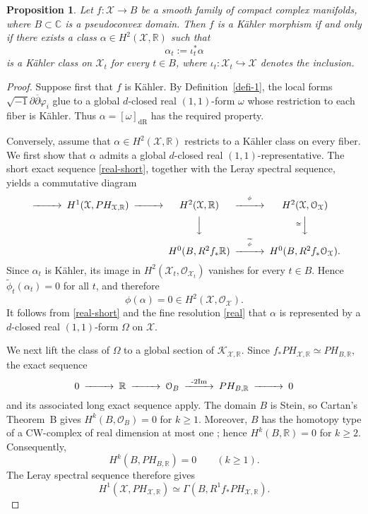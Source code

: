 \documentclass[11pt,letterpaper]{amsart}
\numberwithin{equation}{section}
\newcommand{\CC}{\mathbb{C}}
\newcommand{\RR}{\mathbb{R}}
\newcommand{\cal}{\mathcal}
\def\cO{{\cal O}}
\def\cX{{\cal X}}
\newtheorem{prop}{Proposition}[section]
\def\dbar{\overline{\partial}}
\def\beq{\begin{equation}}
\def\eeq{\end{equation}}
\begin{document}
\begin{prop}\label{global}
Let $f:\cX\to B$ be a smooth family of compact complex manifolds, where $B\subset\CC$ is a pseudoconvex domain. Then $f$ is a K\"ahler morphism if and only if there exists a class $\alpha\in H^2(\cX,\RR)$ such that
\[
 \alpha_t:=\iota_t^*\alpha
\]
is a K\"ahler class on $\cX_t$ for every $t\in B$, where $\iota_t:\cX_t\hookrightarrow\cX$ denotes the inclusion.
\end{prop}
\begin{proof}
Suppose first that $f$ is K\"ahler. By Definition~\ref{defi-1}, the local forms $\sqrt{-1}\partial\dbar\varphi_i$ glue to a global $d$-closed real $(1,1)$-form $\omega$ whose restriction to each fiber is K\"ahler. Thus $\alpha=[\omega]_{\mathrm{dR}}$ has the required property.

Conversely, assume that $\alpha\in H^2(\cX,\RR)$ restricts to a K\"ahler class on every fiber. We first show that $\alpha$ admits a global $d$-closed real $(1,1)$-representative. The short exact sequence \eqref{real-short}, together with the Leray spectral sequence, yields a commutative diagram
\beq\nonumber
\begin{CD}
 @>>>H^1(\cX,PH_{\cX,\RR})@>>>H^2(\cX,\RR) @>^{\phi}>> H^2(\cX,\cO_\cX)\\
 @.@.@VVV@V^{\cong}VV\\
 @.@.H^0(B,R^2f_*\RR)@>^{\widetilde{\phi}}>>H^0(B,R^2f_*\cO_\cX).
\end{CD}
\eeq
Since $\alpha_t$ is K\"ahler, its image in $H^2(\cX_t,\cO_{\cX_t})$ vanishes for every $t\in B$. Hence $\widetilde\phi_t(\alpha_t)=0$ for all $t$, and therefore
\[
 \phi(\alpha)=0\in H^2(\cX,\cO_\cX).
\]
It follows from \eqref{real-short} and the fine resolution \eqref{real} that $\alpha$ is represented by a $d$-closed real $(1,1)$-form $\Omega$ on $\cX$.

We next lift the class of $\Omega$ to a global section of $\mathcal K_{\cX,\RR}$. Since $f_*PH_{\cX,\RR}\simeq PH_{B,\RR}$, the exact sequence
\beq\label{relation-2}
\begin{CD}
0@>>>  \RR @>>> \cO_{B}@>\text{-2Im}>>PH_{B,\RR}@>>>0
\end{CD}
\eeq
and its associated long exact sequence apply. The domain $B$ is Stein, so Cartan's Theorem~B gives $H^k(B,\cO_B)=0$ for $k\ge1$. Moreover, $B$ has the homotopy type of a CW-complex of real dimension at most one \cite[p.~39]{Mil63}; hence $H^k(B,\RR)=0$ for $k\ge2$. Consequently,
\[
 H^k(B,PH_{B,\RR})=0\qquad(k\ge1).
\]
The Leray spectral sequence therefore gives
\[
 H^1(\cX,PH_{\cX,\RR})\simeq
 \Gamma(B,R^1f_*PH_{\cX,\RR}).
\]


\end{proof}
\end{document}
